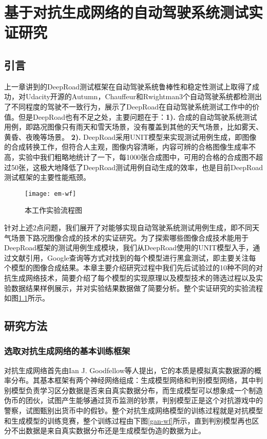 \chapter{基于对抗生成网络的自动驾驶系统测试实证研究}

\section{引言}

上一章讲到的DeepRoad测试框架在自动驾驶系统鲁棒性和稳定性测试上取得了成功，对Udacity开源的Autumn\cite{autumn}，Chauffeur\cite{Chauffeur}和Rwightman\cite{Rwightman}3个自动驾驶系统都检测出了不同程度的驾驶不一致行为，展示了DeepRoad在自动驾驶系统测试工作中的价值。但是DeepRoad也有不足之处，主要问题在于：\textbf{1). }合成的自动驾驶系统测试用例，即路况图像只有雨天和雪天场景，没有覆盖到其他的天气场景，比如雾天、黄昏、夜晚等场景。 \textbf{2). }DeepRoad采用UNIT\cite{UNIT}模型来实现测试用例生成，即图像的合成转换工作，但符合人主观，图像内容清晰，内容可辨的合格图像生成率不高，实验中我们粗略地统计了一下，每1000张合成图中，可用的合格的合成图不超过50张，这极大地降低了DeepRoad测试用例自动生成的效率，也是目前DeepRoad测试框架的主要性能瓶颈。

\begin{figure}[h]
    \centering
    \texttt{[image: em-wf]}
    \caption{本工作实验流程图}
    \label{em-wf}
\end{figure}

针对上述2点问题，我们展开了对能够实现自动驾驶系统测试用例生成，即不同天气场景下路况图像合成的技术的实证研究。为了探索哪些图像合成技术能用于DeepRoad框架的测试用例生成模块，我们从DeepRoad使用的UNIT模型入手，通过文献引用，Google查询等方式对找到的每个模型进行黑盒测试，即主要关注每个模型的图像合成结果。本章主要介绍研究过程中我们先后试验过的10种不同的对抗生成网络技术，简要介绍了每个模型的实现原理以及模型技术的筛选过程以及实验数据结果样例展示，并对实验结果数据做了简要分析。整个实证研究的实验流程如图\ref{em-wf}所示。

\section{研究方法}

\subsection{选取对抗生成网络的基本训练框架}

对抗生成网络\cite{GAN}首先由Ian J. Goodfellow等人提出，它的本质是模拟真实数据源的概率分布。其基本框架有两个神经网络组成：生成模型网络和判别模型网络，其中判别模型负责学习区分数据是否来自真实数据分布，而生成模型可以想象成一个制造伪币的团伙，试图产生能够通过货币监测的钞票，判别模型正是这个对抗游戏中的警察，试图甄别出货币中的假钞。整个对抗生成网络模型的训练过程就是对抗模型和生成模型的训练竞赛，整个训练过程由下图\ref{gan-wf}所示，直到判别模型再也区分不出数据是来自真实数据分布还是生成模型伪造的数据为止。

